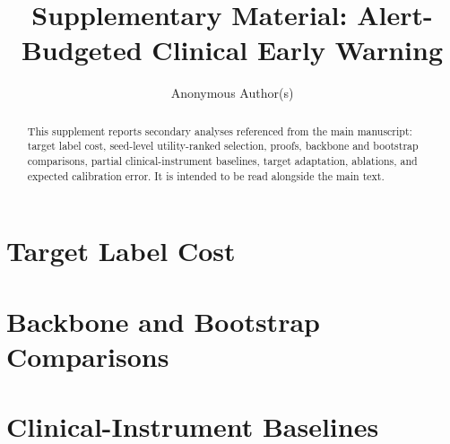\documentclass[3p,times]{elsarticle}
\begin{document}
\begin{frontmatter}
\title{Supplementary Material: Alert-Budgeted Clinical Early Warning}
\author{Anonymous Author(s)}
\begin{abstract}
This supplement reports secondary analyses referenced from the main manuscript: target label cost, seed-level utility-ranked selection, proofs, backbone and bootstrap comparisons, partial clinical-instrument baselines, target adaptation, ablations, and expected calibration error. It is intended to be read alongside the main text.
\end{abstract}
\end{frontmatter}









\section{Target Label Cost}


\section{Backbone and Bootstrap Comparisons}



\section{Clinical-Instrument Baselines}








\end{document}
